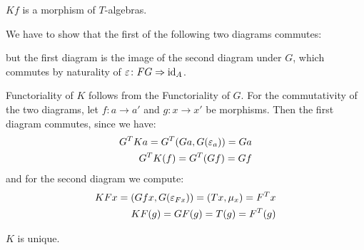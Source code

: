 \begin{beweis}
    \begin{claim}
        $Kf$ is a morphism of $T$-algebras.
    \end{claim}
    \begin{smallproof}
        We have to show that the first of the following two diagrams commutes:
        \begin{figure}[H]
        \centering
        \begin{subfigure}{0.4\textwidth}
        \centering
        \end{subfigure}
        \hspace{2em}
        \begin{subfigure}{0.4\textwidth}
        \centering
        \end{subfigure}
        \end{figure}
        but the first diagram is the image of the second diagram under $G$,
        which commutes by naturality of $\varepsilon \colon FG \Rightarrow \operatorname{id}_A$.
    \end{smallproof}
    Functoriality of $K$ follows from the Functoriality of $G$.
    For the commutativity of the two diagrams, let $f \colon a \to a'$ and $g \colon x \to x'$ 
    be morphisms. Then the first diagram commutes, since we have:
    \begin{align*}
        G^TKa = G^T(Ga,G(\varepsilon_a)) = Ga \\
        G^TK(f) = G^T(Gf) = Gf
    \end{align*}
    and for the second diagram we compute:
    \begin{align*}
        KFx = (Gfx,G(\varepsilon_{Fx})) = (Tx,\mu_x) = F^Tx \\
        KF(g) = GF(g) = T(g) = F^T(g)
    \end{align*}
    \begin{claim}
       $K$ is unique.
    \end{claim}
    \begin{smallproof}
    \end{smallproof}
\end{beweis}

